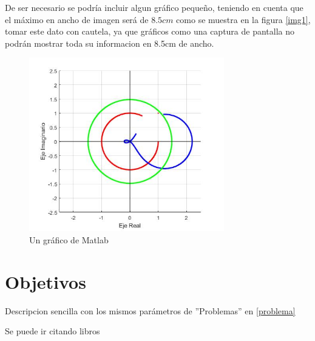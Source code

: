 \documentclass[a4paper]{IEEEtran} %
\begin{document}
De ser necesario se podría incluir algun gráfico pequeño, teniendo en cuenta que el máximo en ancho de imagen será de $8.5cm$ como se muestra en la figura \eqref{img1}, tomar este dato con cautela, ya que gráficos como una captura de pantalla no podrán mostrar toda su informacion en 8.5cm de ancho.

\begin{figure} %
    \centering %
        \includegraphics[width=8.5cm]{imagenes/img1} %
        \caption{Un gráfico de Matlab} %
        \label{img1} %
\end{figure} %


\section{Objetivos}

Descripcion sencilla con los mismos parámetros de ''Problemas''  en \eqref{problema} %

Se puede ir citando libros \cite{libro2, libro3}

\end{document}
